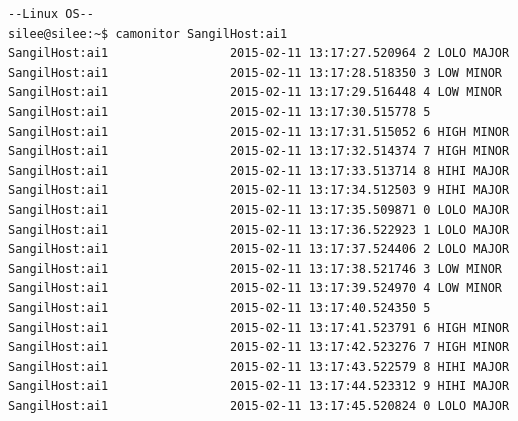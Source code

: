 \documentclass[11pt
  , a4paper
  , article
  , oneside
]{memoir}
\begin{document}
\begin{lstlisting}[style=termstyle]
--Linux OS--
silee@silee:~$ camonitor SangilHost:ai1
SangilHost:ai1                 2015-02-11 13:17:27.520964 2 LOLO MAJOR
SangilHost:ai1                 2015-02-11 13:17:28.518350 3 LOW MINOR
SangilHost:ai1                 2015-02-11 13:17:29.516448 4 LOW MINOR
SangilHost:ai1                 2015-02-11 13:17:30.515778 5  
SangilHost:ai1                 2015-02-11 13:17:31.515052 6 HIGH MINOR
SangilHost:ai1                 2015-02-11 13:17:32.514374 7 HIGH MINOR
SangilHost:ai1                 2015-02-11 13:17:33.513714 8 HIHI MAJOR
SangilHost:ai1                 2015-02-11 13:17:34.512503 9 HIHI MAJOR
SangilHost:ai1                 2015-02-11 13:17:35.509871 0 LOLO MAJOR
SangilHost:ai1                 2015-02-11 13:17:36.522923 1 LOLO MAJOR
SangilHost:ai1                 2015-02-11 13:17:37.524406 2 LOLO MAJOR
SangilHost:ai1                 2015-02-11 13:17:38.521746 3 LOW MINOR
SangilHost:ai1                 2015-02-11 13:17:39.524970 4 LOW MINOR
SangilHost:ai1                 2015-02-11 13:17:40.524350 5  
SangilHost:ai1                 2015-02-11 13:17:41.523791 6 HIGH MINOR
SangilHost:ai1                 2015-02-11 13:17:42.523276 7 HIGH MINOR
SangilHost:ai1                 2015-02-11 13:17:43.522579 8 HIHI MAJOR
SangilHost:ai1                 2015-02-11 13:17:44.523312 9 HIHI MAJOR
SangilHost:ai1                 2015-02-11 13:17:45.520824 0 LOLO MAJOR
\end{lstlisting}
\clearpage


\end{document}
